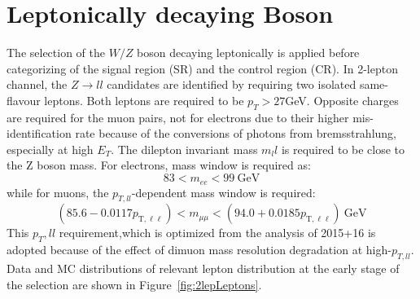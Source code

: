 \section{Leptonically decaying Boson}
The selection of the $W/Z$ boson decaying leptonically is applied before categorizing of the signal region (SR) and the control region (CR).
In 2-lepton channel, the $Z\rightarrow ll $ candidates are identified by requiring two isolated same-flavour leptons. Both leptons are required to be $p_T > 27$GeV.
Opposite charges are required for the muon pairs, not for electrons due to their higher mis-identification rate because of the conversions of photons from bremsstrahlung, especially at high $E_T$. The dilepton invariant mass $m_ll$ is required to be close to the Z boson mass.
For electrons, mass window is required as:
\begin{equation}
83<m_{e e}<99 ~\mathrm{GeV}
\end{equation}
while for muons, the $p_{T,ll}$-dependent mass window is required:
\begin{equation}
\left(85.6-0.0117 p_{\mathrm{T}, \ell \ell}\right)<m_{\mu \mu}<\left(94.0+0.0185 p_{\mathrm{T}, \ell \ell}\right) ~\mathrm{GeV}
\end{equation}
This $p_T,ll$ requirement,which is optimized from the analysis of 2015+16 \cite{} is adopted because of the effect of dimuon mass resolution degradation at high-$p_{T,ll}$.
Data and MC distributions of relevant lepton distribution at the early stage of the selection are shown in Figure~\ref{fig:2lepLeptons}.
